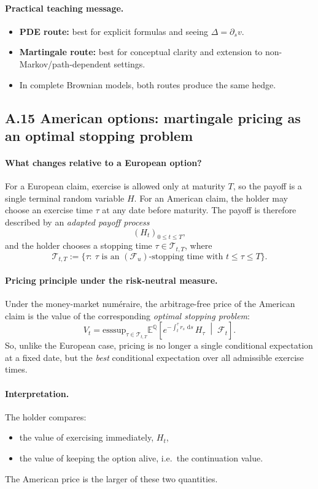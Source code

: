 \documentclass[11pt]{article}
\newcommand{\Qbb}{\mathbb{Q}}
\newcommand{\E}{\mathbb{E}}
\newcommand{\dd}{\,\mathrm{d}}
\newcommand{\1}{\mathbf{1}}
\begin{document}
\paragraph{Practical teaching message.}
\begin{itemize}[leftmargin=1.4em]
    \item \textbf{PDE route:} best for explicit formulas and seeing \(\Delta=\partial_s v\).
    \item \textbf{Martingale route:} best for conceptual clarity and extension to non-Markov/path-dependent settings.
    \item In complete Brownian models, both routes produce the same hedge.
\end{itemize}

\subsection*{A.15 American options: martingale pricing as an optimal stopping problem}

\paragraph{What changes relative to a European option?}
For a European claim, exercise is allowed only at maturity \(T\), so the payoff is a single terminal random variable \(H\).
For an American claim, the holder may choose an exercise time \(\tau\) at any date before maturity.
The payoff is therefore described by an \emph{adapted payoff process}
\[
(H_t)_{0\le t\le T},
\]
and the holder chooses a stopping time \(\tau\in\mathcal T_{t,T}\), where
\[
\mathcal T_{t,T}:=\{\tau:\ \tau\text{ is an }(\mathcal F_u)\text{-stopping time with }t\le \tau\le T\}.
\]

\paragraph{Pricing principle under the risk-neutral measure.}
Under the money-market num\'eraire, the arbitrage-free price of the American claim is the value of the corresponding
\emph{optimal stopping problem}:
\[
V_t
=
\text{esssup}_{\tau\in\mathcal T_{t,T}}
\E^{\Qbb}\!\left[
e^{-\int_t^\tau r_s\,\dd s}\,H_\tau
\;\middle|\;
\mathcal F_t
\right].
\]
So, unlike the European case, pricing is no longer a single conditional expectation at a fixed date,
but the \emph{best} conditional expectation over all admissible exercise times.

\paragraph{Interpretation.}
The holder compares:
\begin{itemize}[leftmargin=1.4em]
    \item the value of exercising immediately, \(H_t\),
    \item the value of keeping the option alive, i.e.\ the continuation value.
\end{itemize}
The American price is the larger of these two quantities.
\end{document}
